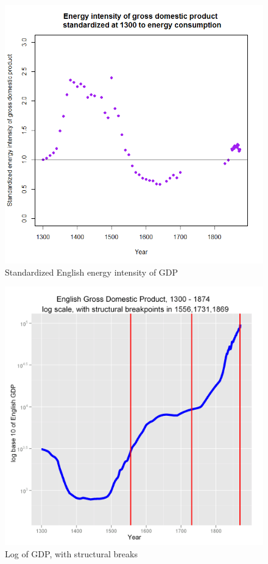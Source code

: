 \documentclass[final]{beamer}
\begin{document}
\begin{frame}
\begin{figure}[p!]
\center
\caption{Standardized English energy intensity of GDP}
\label{fig:energyIntensity}
\includegraphics[height=0.8\textheight]{energyIntensity}
\end{figure}
\end{frame}

\begin{frame}
\begin{figure}[p!]
\center
\caption{Log of GDP, with structural breaks}
\label{fig:gbpgdplog.png}
\includegraphics[height=0.8\textheight]{gbpgdplog.png}
\end{figure}
\end{frame}
\end{document}
